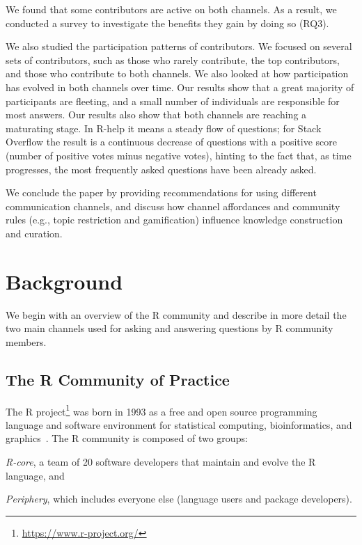 \documentclass[smallextended]{svjour3}       %
\newcommand{\SO}{Stack Overflow\xspace}
\newcommand{\RH}{R-help\xspace}
\begin{document}
We found that some contributors are active on both channels. As a
result, we conducted a survey to investigate the benefits they gain by
doing so (RQ3).

We also studied the participation patterns of contributors. We focused
on several sets of contributors, such as those who rarely contribute,
the top contributors, and those who contribute to both channels. We
also looked at how participation has evolved in both channels over
time. Our results show that a great majority of participants are
fleeting, and a small number of individuals are responsible for most
answers.  Our results also show that both channels are reaching a
maturating stage. In \RH it means a steady flow of questions; for \SO
the result is a continuous decrease of questions with a positive score
(number of positive votes minus negative votes), hinting to the fact
that, as time progresses, the most frequently asked questions have
been already asked.

We conclude the paper by providing recommendations for
using different communication channels, and discuss how channel
affordances and community rules (e.g., topic restriction and
gamification) influence knowledge construction and curation.

 \section{Background}
\label{cha:background}
We begin with an overview of the R community and describe in more detail the two main channels used for asking and answering questions by R community members.

\subsection{The R Community of Practice}
    
    The R project\footnote{\url{https://www.r-project.org/}} was born in 1993 as a free and open source programming language and software environment for statistical computing, bioinformatics, and graphics~\cite{Ihaka1996}.
    The R community is composed of two groups:
    \begin{enumerate*}[label=(\arabic*)]
      \item \textit{R-core}, a team of 20 software developers that maintain and evolve the R language, and
      \item \textit{Periphery}, which includes everyone else (language users and package developers).
    \end{enumerate*}
\end{document}
